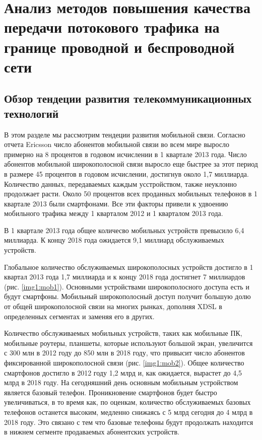 \chapter{Анализ методов повышения качества передачи потокового трафика на границе проводной и беспроводной сети} \label{chapt1}


\section{Обзор тендеции развития телекоммуникационных технологий} \label{sect1_0}
В этом разделе мы рассмотрим тендеции развития мобильной связи.
Согласно отчета Ericsson \cite{ericsson} число абонентов мобильной связи во всем мире выросло примерно на 8 процентов в годовом исчислении в 1 квартале 2013 года. Число абонентов мобильной широкополосной связи выросло еще быстрее за этот период в размере 45 процентов в годовом исчислении, достигнув около 1,7 миллиарда. Количество данных, передаваемых каждым усстройством, также неуклонно продолжает расти. Около 50 процентов всех проданных мобильных телефонов в 1 квартале 2013 были смартфонами. Все эти факторы привели к удвоению мобильного трафика между 1 кварталом 2012 и 1 кварталом 2013 года. 

В 1 квартале 2013 года общее количесво мобильных устройств превысило 6,4 миллиарда. К концу 2018 года ожидается 9,1 миллиард обслуживаемых устройств. 

Глобальное количество обслуживаемых широкополосных устройств достигло в 1 квартал 2013 года 1,7 миллиарда и к концу 2018 года достигнет 7 миллиардов (рис. \ref{img1:mob1}). Основными устройствами широкополосного доступа есть и будут смартфоны. Мобильный широкополосный доступ получит большую долю от общей широкополосной связи на многих рынках, дополняя XDSL в определенных сегментах и заменяя его в других. 

Количество обслуживаемых мобильных устройств, таких как мобильные ПК, мобильные роутеры, планшеты, которые используют большой экран, увеличится с 300 млн в 2012 году до 850 млн в 2018 году, что привысит число абонентов фиксированной широкополосной связи (рис. \ref{img1:mob2}).
Общее количество смартфонов достигло в 2012 году 1,2 млрд и, как ожидается, вырастет до 4,5 млрд в 2018 году. На сегодняшний день основным мобильным устройством является базовый телефон. Проникновение смартфонов будет быстро увеличиваться, в то время как, по оценкам, количество обслуживаемых базовых телефонов останется высоким, медленно снижаясь с 5 млрд сегодня до 4 млрд в 2018 году. Это связано с тем что базовые телефоны будут продолжать находится в нижнем сегменте продаваемых абонентских устройств.

